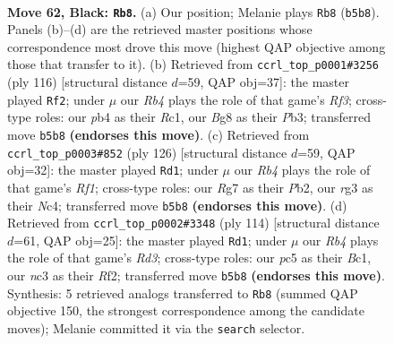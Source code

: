 \documentclass[11pt]{article}
\begin{document}
\clearpage

\begin{figure}[p]\centering
\begin{subfigure}{0.46\textwidth}\centering
\resizebox{\linewidth}{!}{%
\newchessgame
\chessboard[
  setfen={6b1/p1pk2r1/P1p3p1/1rP2p1p/RP3P1P/2N3R1/5K2/8 b - - 47 62},
  showmover=false,
  pgfstyle=straightmove, color=movearrow, markmove={b5-b8}
]}
\caption{}
\end{subfigure}\hfill
\begin{subfigure}{0.46\textwidth}\centering
\resizebox{\linewidth}{!}{%
\newchessgame
\chessboard[
  setfen={3k1r2/8/1p2r1p1/p2p2Pp/P4P1P/1P1B1R2/K2n4/2R5 w - - 22 59},
  showmover=false,
  pgfstyle=straightmove, color=movearrow, markmove={f3-f2}
]}
\caption{}
\end{subfigure}
\\[4pt]
\begin{subfigure}{0.46\textwidth}\centering
\resizebox{\linewidth}{!}{%
\newchessgame
\chessboard[
  setfen={3r4/2k5/r2pRpp1/2pP4/2N2P1p/2K3nP/1P4P1/5R2 w - - 6 64},
  showmover=false,
  pgfstyle=straightmove, color=movearrow, markmove={f1-d1}
]}
\caption{}
\end{subfigure}\hfill
\begin{subfigure}{0.46\textwidth}\centering
\resizebox{\linewidth}{!}{%
\newchessgame
\chessboard[
  setfen={2k3r1/p7/1pp1pbr1/6p1/PnNP2P1/1P1R3P/5RK1/2B5 w - - 2 58},
  showmover=false,
  pgfstyle=straightmove, color=movearrow, markmove={d3-d1}
]}
\caption{}
\end{subfigure}
\caption{\textbf{Move 62, Black: \texttt{Rb8}.} (a) Our position; Melanie plays \texttt{Rb8} (\texttt{b5b8}). Panels (b)--(d) are the retrieved master positions whose correspondence most drove this move (highest QAP objective among those that transfer to it). (b) Retrieved from \texttt{ccrl\_top\_p0001\#3256} (ply 116) [structural distance $d$=59, QAP obj=37]: the master played \texttt{Rf2}; under $\mu$ our \emph{Rb4} plays the role of that game's \emph{Rf3}; cross-type roles: our \emph{p}b4 as their \emph{R}c1, our \emph{B}g8 as their \emph{P}b3; transferred move \texttt{b5b8} \textbf{(endorses this move)}. (c) Retrieved from \texttt{ccrl\_top\_p0003\#852} (ply 126) [structural distance $d$=59, QAP obj=32]: the master played \texttt{Rd1}; under $\mu$ our \emph{Rb4} plays the role of that game's \emph{Rf1}; cross-type roles: our \emph{R}g7 as their \emph{P}b2, our \emph{r}g3 as their \emph{N}c4; transferred move \texttt{b5b8} \textbf{(endorses this move)}. (d) Retrieved from \texttt{ccrl\_top\_p0002\#3348} (ply 114) [structural distance $d$=61, QAP obj=25]: the master played \texttt{Rd1}; under $\mu$ our \emph{Rb4} plays the role of that game's \emph{Rd3}; cross-type roles: our \emph{p}c5 as their \emph{B}c1, our \emph{n}c3 as their \emph{R}f2; transferred move \texttt{b5b8} \textbf{(endorses this move)}. Synthesis: 5 retrieved analogs transferred to \texttt{Rb8} (summed QAP objective 150, the strongest correspondence among the candidate moves); Melanie committed it via the \texttt{search} selector.}
\label{fig:thought-m123}
\end{figure}
\end{document}
